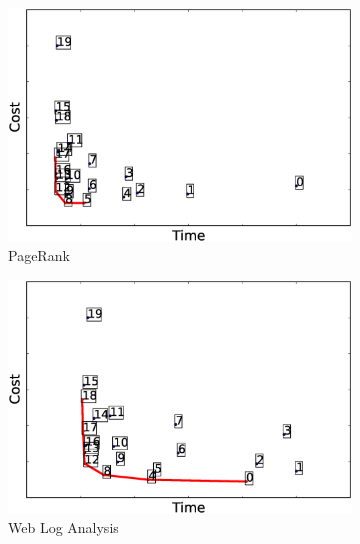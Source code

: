 \begin{figure}
	\captionsetup{justification=centering}
    \centering
	\begin{subfigure}[b]{0.3\textwidth}
        \includegraphics[width=\textwidth]{Chapter-CAT/figures/pagerank_elapsed_cost_all_frontier.eps}
        \caption{PageRank}
        \label{fig:pagerank_configurations}
    \end{subfigure}
    \begin{subfigure}[b]{0.3\textwidth}
        \includegraphics[width=\textwidth]{Chapter-CAT/figures/webloganalysis_elapsed_cost_all_frontier.eps}
        \caption{Web Log Analysis}
        \label{fig:webloganalysis_configurations}
    \end{subfigure}
    \begin{subfigure}[b]{0.3\textwidth}

\end{subfigure}
\end{figure}
